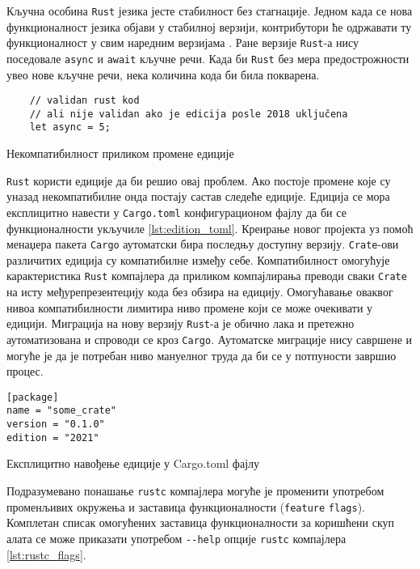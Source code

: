 Кључна особина \verb|Rust| језика јесте стабилност без стагнације. Једном када се нова 
функционалност језика објави у стабилној верзији, контрибутори ће одржавати 
ту функционалност у свим наредним верзијама \cite{editions}.
Ране верзије \verb|Rust|-а нису поседовале \verb|async| и \verb|await| кључне речи.
Када би \verb|Rust| без мера предострожности увео нове кључне речи, нека количина кода би била покварена.

\begin{listing}[H]
\begin{verbatim}
    // validan rust kod 
    // ali nije validan ako je edicija posle 2018 uključena
    let async = 5; 
\end{verbatim}
\caption{Некомпатибилност приликом промене едиције}
\label{lst:edition}
\end{listing}


\verb|Rust| користи едиције да би решио овај проблем. Ако постоје промене које су уназад 
некомпатибилне онда постају састав следеће едиције. Едиција се мора експлицитно навести 
у \verb|Cargo.toml| конфигурационом фајлу да би се функционалности укључиле \ref{lst:edition_toml}. Креирање новог пројекта уз 
помоћ менаџера пакета \verb|Cargo| аутоматски бира последњу доступну верзију.
\verb|Crate|-ови различитих едиција су компатибилне између себе. Компатибилност омогућује 
карактеристика \verb|Rust| компајлера да приликом компајлирања преводи сваки \verb|Crate| на исту међурепрезентецију 
кода без обзира на едицију. Омогућавање оваквог нивоа компатибилности лимитира ниво промене 
који се може очекивати у едицији. Миграција на нову верзију \verb|Rust|-а је обично лака и претежно аутоматизована
и спроводи се кроз \verb|Cargo|. Аутоматске миграције нису савршене и могуће је да је потребан ниво мануелног 
труда да би се у потпуности завршио процес.

\begin{listing}[H]
\begin{verbatim}
[package]
name = "some_crate"
version = "0.1.0"
edition = "2021"

\end{verbatim}
\caption{Експлицитно навођење едиције у Cargo.toml фајлу}
\label{lst:edition_toml}
\end{listing}

Подразумевано понашање \verb|rustc| компајлера могуће је променити употребом променљивих окружења 
и заставица функционалности (\verb|feature| \verb|flags|). Комплетан списак омогућених заставица функционалности 
за коришћени скуп алата се може приказати употребом \verb|--help| опције \verb|rustc| компајлера \ref{lst:rustc_flags}.


